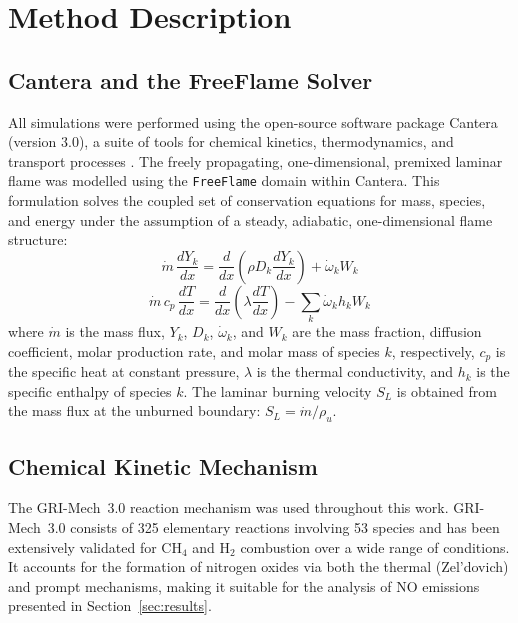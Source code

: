 \documentclass[12pt,a4paper]{article}
\begin{document}
\section{Method Description}

\subsection{Cantera and the FreeFlame Solver}

All simulations were performed using the open-source software package Cantera (version 3.0), a suite of tools for chemical kinetics, thermodynamics, and transport processes \cite{cantera}. The freely propagating, one-dimensional, premixed laminar flame was modelled using the \texttt{FreeFlame} domain within Cantera. This formulation solves the coupled set of conservation equations for mass, species, and energy under the assumption of a steady, adiabatic, one-dimensional flame structure:
\begin{equation}
    \dot{m}\,\frac{dY_k}{dx} = \frac{d}{dx}\!\left(\rho D_k \frac{dY_k}{dx}\right) + \dot{\omega}_k W_k
    \label{eq:species}
\end{equation}
\begin{equation}
    \dot{m}\,c_p\,\frac{dT}{dx} = \frac{d}{dx}\!\left(\lambda \frac{dT}{dx}\right)
    - \sum_k \dot{\omega}_k h_k W_k
    \label{eq:energy}
\end{equation}
where \(\dot{m}\) is the mass flux, \(Y_k\), \(D_k\), \(\dot{\omega}_k\), and \(W_k\) are the mass fraction, diffusion coefficient, molar production rate, and molar mass of species \(k\), respectively, \(c_p\) is the specific heat at constant pressure, \(\lambda\) is the thermal conductivity, and \(h_k\) is the specific enthalpy of species \(k\). The laminar burning velocity \(S_L\) is obtained from the mass flux at the unburned boundary: \(S_L = \dot{m}/\rho_u\).

\subsection{Chemical Kinetic Mechanism}

The GRI-Mech~3.0 reaction mechanism \cite{grimech} was used throughout this work. GRI-Mech~3.0 consists of 325 elementary reactions involving 53 species and has been extensively validated for \(\mathrm{CH_4}\) and \(\mathrm{H_2}\) combustion over a wide range of conditions. It accounts for the formation of nitrogen oxides via both the thermal (Zel'dovich) and prompt mechanisms, making it suitable for the analysis of NO emissions presented in Section~\ref{sec:results}.
\end{document}
